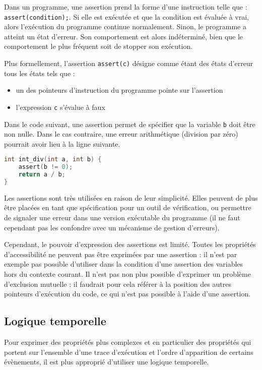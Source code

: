 Dans un programme, une assertion prend la forme d'une instruction telle que :\\
\texttt{assert(condition);}.
Si elle est exécutée et que la condition est évaluée à vrai, alors l'exécution
du programme continue normalement.
Sinon, le programme a atteint un état d'erreur. Son comportement est alors
indéterminé, bien que le comportement le plus fréquent soit de stopper son
exécution.

Plus formellement, l'assertion \texttt{assert(c)} désigne comme étant des
états d'erreur tous les états tels que :

\begin{itemize}
\item
  un des pointeurs d'instruction du programme pointe sur l'assertion
\item
  l'expression \texttt{c} s'évalue à faux
\end{itemize}

Dans le code suivant, une assertion permet de spécifier que la variable
\texttt{b} doit être non nulle. Dans le cas contraire, une erreur
arithmétique (division par zéro) pourrait avoir lieu à la ligne suivante.

\begin{lstlisting}[language=C, frame=single]
int int_div(int a, int b) {
    assert(b != 0);
    return a / b;
}
\end{lstlisting}

Les assertions sont très utilisées en raison de leur simplicité.
Elles peuvent de plus être placées en tant que spécification pour un outil de
vérification, ou permettre de signaler une erreur dans une version exécutable
du programme (il ne faut cependant pas les confondre avec un mécanisme de
gestion d'erreurs).

Cependant, le pouvoir d'expression des assertions est limité. Toutes les
propriétés d'accessibilité ne peuvent pas être exprimées par une assertion : il
n'est par exemple pas possible d'utiliser dans la condition d'une assertion des
variables hors du contexte courant. Il n'est pas non plus possible d'exprimer un
problème d'exclusion mutuelle : il faudrait pour cela référer à la position des
autres pointeurs d'exécution du code, ce qui n'est pas possible à l'aide d'une
assertion.

\subsection{Logique temporelle}

Pour exprimer des propriétés plus complexes et en particulier des propriétés qui
portent sur l'ensemble d'une trace d'exécution et l'ordre d'apparition de
certains évènements, il est plus approprié d'utiliser une logique temporelle.

